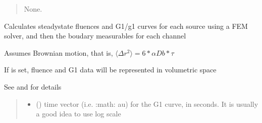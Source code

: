 \documentclass[letterpaper,10pt,english]{sphinxmanual}
\begin{document}
\begin{fulllineitems}
\begin{fulllineitems}
\begin{quote}
\begin{description}
\begin{itemize}
\end{itemize}

\sphinxAtStartPar
None.

\end{description}\end{quote}

\end{fulllineitems}


\begin{fulllineitems}
\label{\detokenize{_autosummary/nirfasterff.base.dcs_mesh.dcsmesh:nirfasterff.base.dcs_mesh.dcsmesh.femdata}}
\pysigstartsignatures
\pysiglinewithargsret
{}
{\sphinxparamcomma {}\sphinxparamcomma {}}
{}
\pysigstopsignatures
\sphinxAtStartPar
Calculates steady\sphinxhyphen{}state fluences and G1/g1 curves for each source using a FEM solver, and then the boudary measurables for each channel

\sphinxAtStartPar
Assumes Brownian motion, that is, \(\langle\Delta r^2\rangle=6*\alpha Db*\tau\)

\sphinxAtStartPar
If  is set, fluence and G1 data will be represented in volumetric space

\sphinxAtStartPar
See {\hyperref[\detokenize{_autosummary/nirfasterff.forward.femdata.femdata_DCS:nirfasterff.forward.femdata.femdata_DCS}]{}} and {\hyperref[\detokenize{_autosummary/nirfasterff.forward.femdata.femdata_stnd_CW:nirfasterff.forward.femdata.femdata_stnd_CW}]{}} for details
\begin{quote}\begin{description}
\begin{itemize}
\item {} 
\sphinxAtStartPar
{} () \textendash{} time vector (i.e. :math:\textasciigrave{}   au\textasciigrave{}) for the G1 curve, in seconds. It is usually a good idea to use log scale


\end{itemize}
\end{description}
\end{quote}
\end{fulllineitems}
\end{fulllineitems}
\end{document}
